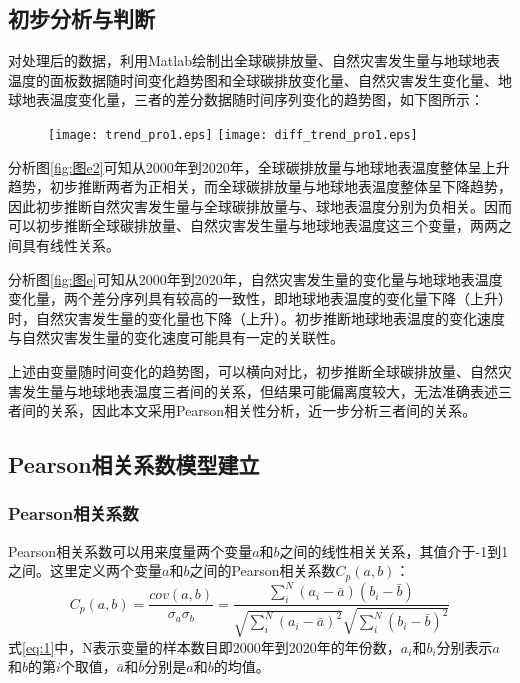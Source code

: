 \documentclass[withoutpreface,bwprint]{cumcmthesis}
\begin{document}
\subsection{初步分析与判断}
对处理后的数据，利用Matlab绘制出全球碳排放量、自然灾害发生量与地球地表温度的面板数据随时间变化趋势图和全球碳排放变化量、自然灾害发生变化量、地球地表温度变化量，三者的差分数据随时间序列变化的趋势图，如下图所示：

\begin{figure}[htbp]
	\centering
	{\texttt{[image: trend\_pro1.eps]}}
	{\texttt{[image: diff\_trend\_pro1.eps]}}
	\caption{ }
	\label{fig:333i}
\end{figure} 
分析图\ref{fig:图e2}可知从2000年到2020年，全球碳排放量与地球地表温度整体呈上升趋势，初步推断两者为正相关，而全球碳排放量与地球地表温度整体呈下降趋势，因此初步推断自然灾害发生量与全球碳排放量与、球地表温度分别为负相关。因而可以初步推断全球碳排放量、自然灾害发生量与地球地表温度这三个变量，两两之间具有线性关系。

分析图\ref{fig:图e}可知从2000年到2020年，自然灾害发生量的变化量与地球地表温度变化量，两个差分序列具有较高的一致性，即地球地表温度的变化量下降（上升）时，自然灾害发生量的变化量也下降（上升）。初步推断地球地表温度的变化速度与自然灾害发生量的变化速度可能具有一定的关联性。

上述由变量随时间变化的趋势图，可以横向对比，初步推断全球碳排放量、自然灾害发生量与地球地表温度三者间的关系，但结果可能偏离度较大，无法准确表述三者间的关系，因此本文采用Pearson相关性分析，近一步分析三者间的关系。


\subsection{Pearson相关系数模型建立}
\subsubsection{Pearson相关系数}Pearson相关系数可以用来度量两个变量$a$和$b$之间的线性相关关系，其值介于-1到1之间。这里定义两个变量$a$和$b$之间的Pearson相关系数${{C}_{p}}(a,b)$：
\begin{equation}
\label{eq:1}
	{{C}_{p}}(a,b)=\frac{cov(a,b)}{{{\sigma }_{a}}{{\sigma }_{b}}}=\frac{\sum_{i}^{N}{({{a}_{i}}-\bar{a})({{b}_{i}}-\bar{b})}}{\sqrt{\sum_{i}^{N}{{{({{a}_{i}}-\bar{a})}^{2}}}}\sqrt{\sum_{i}^{N}{{{({{b}_{i}}-\bar{b})}^{2}}}}}
\end{equation}
    式\eqref{eq:1}中，N表示变量的样本数目即2000年到2020年的年份数，${{a}_{i}}$和${{b}_{i}}$分别表示$a$和$b$的第$i$个取值，$\bar{a}$和$\bar{b}$分别是$a$和$b$的均值。
\end{document}

